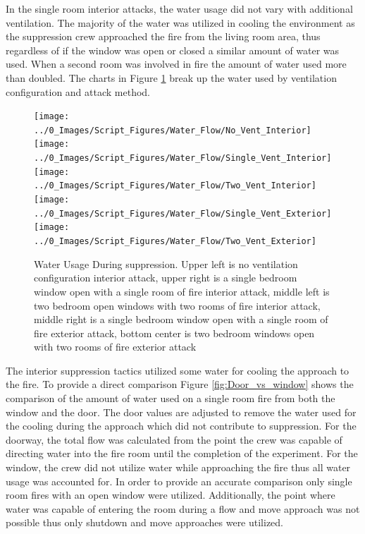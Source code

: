 \documentclass[12pt,oneside]{book}
\begin{document}
In the single room interior attacks, the water usage did not vary with additional ventilation. The majority of the water was utilized in cooling the environment as the suppression crew approached the fire from the living room area, thus regardless of if the window was open or closed a similar amount of water was used. When a second room was involved in fire the amount of water used more than doubled. The charts in Figure \ref{fig:water_flow_vent_compare} break up the water used by ventilation configuration and attack method.  

\begin{figure}[H]
\centering
\texttt{[image: ../0\_Images/Script\_Figures/Water\_Flow/No\_Vent\_Interior]}
\texttt{[image: ../0\_Images/Script\_Figures/Water\_Flow/Single\_Vent\_Interior]}
\texttt{[image: ../0\_Images/Script\_Figures/Water\_Flow/Two\_Vent\_Interior]}
\texttt{[image: ../0\_Images/Script\_Figures/Water\_Flow/Single\_Vent\_Exterior]}
\texttt{[image: ../0\_Images/Script\_Figures/Water\_Flow/Two\_Vent\_Exterior]}
\caption[Water Usage vs. Ventilation]{Water Usage During suppression. Upper left is no ventilation configuration interior attack, upper right is a single bedroom window open with a single room of fire interior attack, middle left is two bedroom open windows with two rooms of fire interior attack, middle right is a single bedroom window open with a single room of fire exterior attack, bottom center is two bedroom windows open with two rooms of fire exterior attack}
\label{fig:water_flow_vent_compare}
\end{figure}

The interior suppression tactics utilized some water for cooling the approach to the fire. To provide a direct comparison Figure \ref{fig:Door_vs_window} shows the comparison of the amount of water used on a single room fire from both the window and the door. The door values are adjusted to remove the water used for the cooling during the approach which did not contribute to suppression. For the doorway, the total flow was calculated from the point the crew was capable of directing water into the fire room until the completion of the experiment. For the window, the crew did not utilize water while approaching the fire thus all water usage was accounted for. In order to provide an accurate comparison only single room fires with an open window were utilized. Additionally, the point where water was capable of entering the room during a flow and move approach was not possible thus only shutdown and move approaches were utilized.
\end{document}
